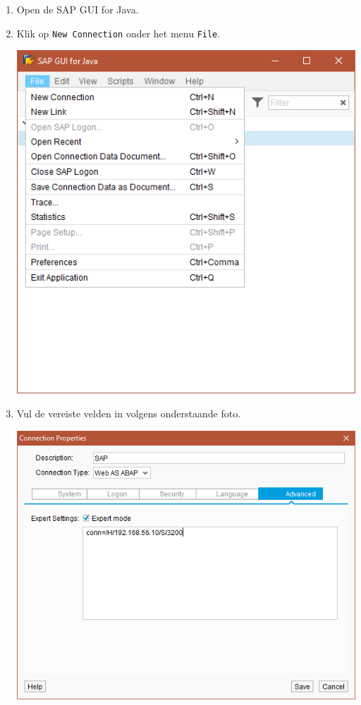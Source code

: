 \documentclass[a4paper, 11pt]{article}
\providecommand{\tightlist}{%
    \setlength{\itemsep}{0pt}
    \setlength{\parskip}{0pt}
}
\begin{document}
\begin{enumerate}
\tightlist
\item
  Open de SAP GUI for Java.
\item
  Klik op \texttt{New\ Connection} onder het menu \texttt{File}.
  \begin{center}
    \includegraphics[scale=0.7,center]{img/file.png}
  \end{center}
\end{enumerate}

\begin{enumerate}
\setcounter{enumi}{2}
\tightlist
\item
  Vul de vereiste velden in volgens onderstaande foto.
\begin{center}
    \includegraphics[scale=0.9,center]{img/connectie.png}
\end{center}
\end{enumerate}
\end{document}
